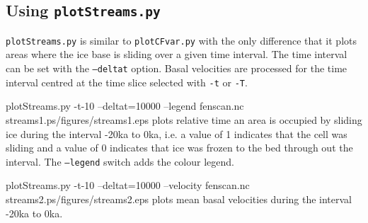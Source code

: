 \subsection{Using \texttt{plotStreams.py}}
\texttt{plotStreams.py} is similar to \texttt{plotCFvar.py} with the only difference that it plots areas where the ice base is sliding over a given time interval. The time interval can be set with the \texttt{--deltat} option. Basal velocities are processed for the time interval centred at the time slice selected with \texttt{-t} or \texttt{-T}.

\begin{pycf}{plotStreams.py -t-10 --deltat=10000 --legend fenscan.nc streams1.ps}{\dir/figures/streams1.eps}
plots relative time an area is occupied by sliding ice during the interval -20ka to 0ka, i.e. a value of 1 indicates that the cell was sliding and a value of 0 indicates that ice was frozen to the bed  through out the interval. The \texttt{--legend} switch adds the colour legend.
\end{pycf}

\begin{pycf}{plotStreams.py -t-10 --deltat=10000 --velocity fenscan.nc streams2.ps}{\dir/figures/streams2.eps}
plots mean basal velocities during the interval -20ka to 0ka.
\end{pycf}
